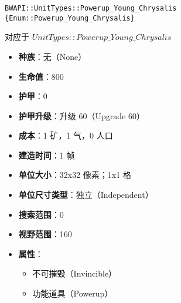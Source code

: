 \begin{tcolorbox}[colback=white, colframe=black!60!white, title=Powerup\_Young\_Chrysalis(), arc=0mm]
    \begin{verbatim}
BWAPI::UnitTypes::Powerup_Young_Chrysalis {Enum::Powerup_Young_Chrysalis}
    \end{verbatim}
    对应于  $UnitTypes::Powerup\_Young\_Chrysalis$ 
    \begin{itemize}
        \item \textbf{种族}：无（None）
        \item \textbf{生命值}：800
        \item \textbf{护甲}：0
        \item \textbf{护甲升级}：升级 60（Upgrade 60）
        \item \textbf{成本}：1 矿，1 气，0 人口
        \item \textbf{建造时间}：1 帧
        \item \textbf{单位大小}：32x32 像素；1x1 格
        \item \textbf{单位尺寸类型}：独立（Independent）
        \item \textbf{搜索范围}：0
        \item \textbf{视野范围}：160
        \item \textbf{属性}：
            \begin{itemize}
                \item 不可摧毁（Invincible）
                \item 功能道具（Powerup）
            \end{itemize}
    \end{itemize}
\end{tcolorbox}

